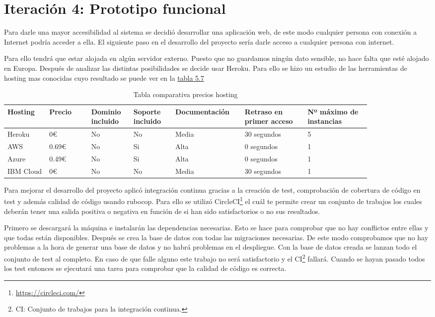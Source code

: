 \section{Iteración 4: Prototipo funcional}

Para darle una mayor accesibilidad al sistema se decidió desarrollar
una aplicación web, de este modo cualquier persona con conexión a
Internet podría acceder a ella. El siguiente paso en el desarrollo
del proyecto sería darle acceso a cualquier persona con internet.

Para ello tendrá que estar alojada en algún servidor externo.
Puesto que no guardamos ningún dato sensible, no hace falta
que esté alojado en Europa. Después de analizar las distintas posibilidades
se decide usar Heroku. Para ello se hizo un estudio de las herramientas
de hosting mas conocidas cuyo resultado se puede ver en la \hyperref[tab:Tabla comparativa precios hosting]{tabla 5.7}

\begin{longtable}{|p{0.1\linewidth}p{0.1\linewidth}p{0.1\linewidth}p{0.1\linewidth}p{0.15\linewidth}p{0.15\linewidth}p{0.15\linewidth}|}
  \caption{Tabla comparativa precios hosting}
  \label{tab:Tabla comparativa precios hosting}
  \endfirsthead
  \endhead
  \hline
  \multicolumn{1}{|l}{Hosting} & Precio & Dominio incluido & Soporte incluido & Documentación & Retraso en primer acceso & Nº máximo de instancias \\ \hline
  Heroku & 0€ & No & No & Media & 30 segundos & 5 \\ \hline
  AWS & 0.69€ & No & Si & Alta & 0 segundos & 1 \\ \hline
  Azure & 0.49€ & No & Si & Alta & 0 segundos & 1 \\ \hline
  IBM Cloud & 0€ & No & No & Media & 30 segundos & 1 \\ \hline
\end{longtable}

Para mejorar el desarrollo del proyecto aplicó integración continua gracias
a la creación de test, comprobación de cobertura de código en test y además
calidad de código usando rubocop. Para ello se utilizó CircleCI\footnote{\url{https://circleci.com/}} el cuál te
permite crear un conjunto de trabajos los cuales deberán tener una salida
positiva o negativa en función de si han sido satisfactorios o no sus resultados.

Primero se descargará la máquina e instalarán las dependencias necesarias.
Esto se hace para comprobar que no hay conflictos entre ellas y que todas
están disponibles. Después se crea la base de datos con todas las migraciones
necesarias. De este modo comprobamos que no hay problemas a la hora
de generar una base de datos y no habrá problemas en el despliegue.
Con la base de datos creada se lanzan todo el conjunto de test al completo.
En caso de que falle alguno este trabajo no será satisfactorio y el CI\footnote{CI: Conjunto de trabajos para la integración continua.}
fallará. Cuando se hayan pasado todos los test entonces se ejecutará
una tarea para comprobar que la calidad de código es correcta.

